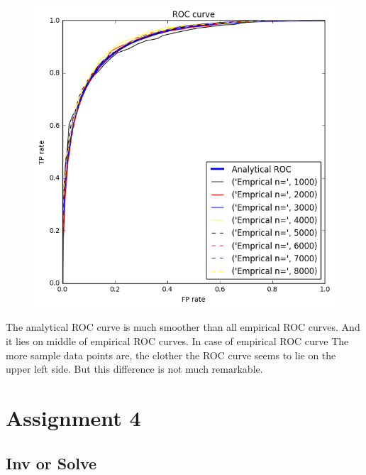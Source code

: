 \documentclass[a4paper,11pt]{article}
\begin{document}
\begin{verbatim}








\end{verbatim}

\begin{figure}[htbp]
  \includegraphics[scale=0.6]{rocall.png}
\end{figure}

The analytical ROC curve is much smoother than all empirical ROC curves. And it lies on middle of empirical ROC curves. In case of empirical ROC curve The more sample data points are, the clother the ROC curve seems to lie on the upper left side. But this difference is not much remarkable.

	


\section*{Assignment 4}
\subsection*{Inv or Solve}
\end{document}

